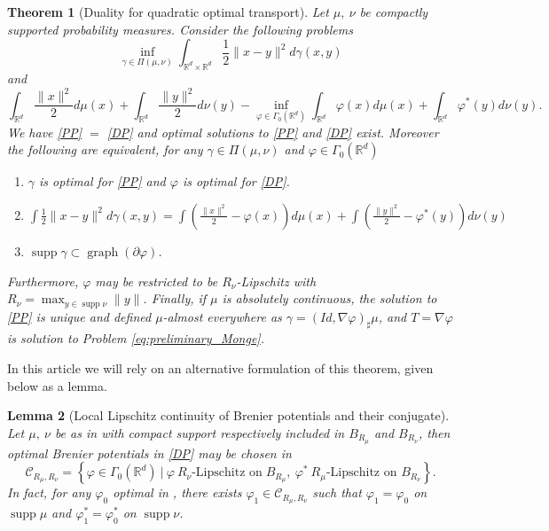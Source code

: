 \documentclass[11pt]{article}
\newtheorem{lemma}{Lemma}[section]
\newtheorem{theorem}[lemma]{Theorem}
\DeclareMathOperator{\supp}{supp}
\DeclareMathOperator{\graph}{graph}
\newcommand{\R}{\mathbb R}
\newcommand{\1}{\mathbbm{1}}
\numberwithin{equation}{section}
\begin{document}
\begin{theorem}[Duality for quadratic optimal transport]
    Let $\mu,\:\nu$ be compactly supported probability measures. Consider the following problems 
    \begin{equation}\label{PP}\tag{PP}
        \inf_{\gamma\in\Pi(\mu,\nu)}\int_{\R^d \times \R^d}\frac{1}{2}\|x-y\|^2d\gamma(x,y)
    \end{equation}
    and
    \begin{equation}\label{DP}\tag{DP}
        \int_{\R^d} \frac{\|x\|^2}{2} d\mu(x)+ \int_{\R^d} \frac{\|y\|^2}{2}d\nu(y) - \inf_{\varphi\in \Gamma_0(\R^d)} \int_{\R^d} \varphi(x) d\mu(x) + \int_{\R^d}\varphi^*(y) d\nu(y).
    \end{equation}
    We have \eqref{PP} $=$ \eqref{DP} and optimal solutions to \eqref{PP} and \eqref{DP} exist. Moreover the following are equivalent, for any $\gamma \in \Pi(\mu,\nu)$ and $\varphi \in \Gamma_0(\R^d)$  
    \begin{enumerate}
        \item  $\gamma$ is optimal for \eqref{PP} and $\varphi$ is optimal for \eqref{DP}.
        \item $\int\frac{1}{2}\|x-y\|^2d\gamma(x,y) = \int \left(\frac{\|x\|^2}{2} - \varphi(x) \right)d\mu(x) + \int \left(\frac{\|y\|^2}{2} - \varphi^*(y)\right) d\nu(y)$
        \item $\supp \gamma\subset \graph(\partial \varphi)$.
    \end{enumerate}
    Furthermore, $\varphi$ may be restricted to be  $R_\nu$-Lipschitz with $R_\nu=\max_{y\in \supp \nu} \|y\|$.
    Finally, if $\mu$ is absolutely continuous, the solution to \eqref{PP} is unique and defined $\mu$-almost everywhere as $\gamma=(Id,\nabla\varphi)_\sharp\mu$, and $T = \nabla \varphi$ is solution to Problem \eqref{eq:preliminary_Monge}.
    \label{th:classical_duality_theorem}
\end{theorem}

In this article we will rely on an alternative formulation of this theorem, given below as a lemma.
\begin{lemma}[{Local Lipschitz continuity of Brenier potentials and their conjugate}]
    Let $\mu,\:\nu$ be as in  with compact support respectively included in  $B_{R_\mu}$ and $B_{R_\nu}$, then optimal Brenier potentials in \eqref{DP} may be chosen in
    \begin{equation*}
        \mathcal{C}_{R_\mu,R_\nu}=\left\{\varphi\in\Gamma_0(\R^d)\:\Big|\:\varphi\:R_\nu\text{-Lipschitz on}\;B_{R_\mu},\:\varphi^*\:R_\mu\text{-Lipschitz on }B_{R_\nu}\right\}.
    \end{equation*}
    In fact, for any $\varphi_0$ optimal in , there exists $\varphi_1 \in \mathcal{C}_{R_\mu,R_\nu}$ such that $\varphi_1 = \varphi_0$ on $\supp \mu$ and $\varphi_1^* = \varphi_0^*$ on $\supp \nu$.
    \label{lem:brenier_potentials}
\end{lemma}
\end{document}
